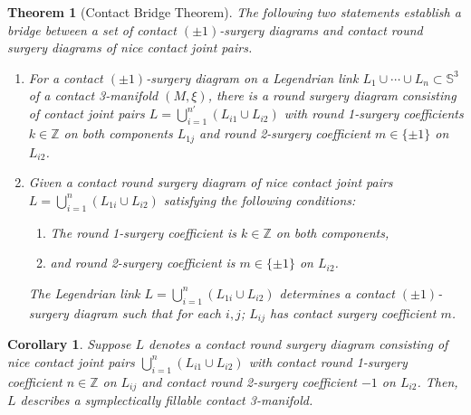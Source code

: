 \documentclass[10pt,a4paper]{amsart}
\newtheorem{thm}{Theorem}
\newtheorem{cor}{Corollary}
\newcommand{\s}{\mathbb{S}}
\begin{document}
\begin{thm}[Contact Bridge Theorem]\label{thm: ContBridgeThm}
The following two statements establish a bridge between a set of contact $(\pm1)$-surgery diagrams and contact round surgery diagrams of nice contact joint pairs. 
\begin{enumerate}
    \item [(1)] For a contact $(\pm1)$-surgery diagram on a Legendrian link $L_1 \cup \cdots \cup L_n \subset \s^3$ of a contact 3-manifold $(M, \xi)$, there is a round surgery diagram consisting of contact joint pairs $L= \bigcup_{i=1}^{n'} (L_{i1}\cup L_{i2})$ with round 1-surgery coefficients $k\in \mathbb{Z} $ on both components $L_{1j}$ and round 2-surgery coefficient $m \in \{\pm1\}$ on $L_{i2}$. 
    \item [(2)]Given a contact round surgery diagram of nice contact joint pairs $L= \bigcup_{i=1}^{n} (L_{1i}\cup L_{i2})$ satisfying the following conditions: 
    \begin{enumerate}
        \item The round 1-surgery coefficient is $k \in  \mathbb{Z}$ on both components, 
        \item and round 2-surgery coefficient is $m\in \{\pm1\}$ on $L_{i2}$. 
    \end{enumerate}
    The Legendrian link $L= \bigcup_{i=1}^{n} (L_{1i}\cup L_{i2})$ determines a contact $(\pm1)$-surgery diagram such that for each $i,j$; $L_{ij}$ has contact surgery coefficient $m$. 
\end{enumerate}
    
\end{thm}

\begin{cor}
    Suppose $L$ denotes a contact round surgery diagram consisting of nice contact joint pairs $\bigcup_{i=1}^{n}(L_{i1}\cup L_{i2})$ with contact round 1-surgery coefficient $n\in \mathbb{Z}$ on $L_{ij}$ and contact round 2-surgery coefficient $-1$ on $L_{i2}$. Then, $L$ describes a symplectically fillable contact 3-manifold.  
\end{cor}
\end{document}
